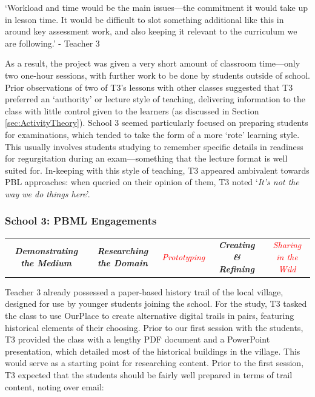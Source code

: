 \begin{displayquote}
`Workload and time would be the main issues---the commitment it would take up in lesson time. It would be difficult to slot something additional like this in around key assessment work, and also keeping it relevant to the curriculum we are following.' - Teacher 3
\end{displayquote}

As a result, the project was given a very short amount of classroom time---only two one-hour sessions, with further work to be done by students outside of school. Prior observations of two of T3's lessons with other classes suggested that T3 preferred an `authority' or lecture style of teaching, delivering information to the class with little control given to the learners (as discussed in Section \ref{sec:ActivityTheory}). School 3 seemed particularly focused on preparing students for examinations, which tended to take the form of a more `rote' learning style. This usually involves students studying to remember specific details in readiness for regurgitation during an exam---something that the lecture format is well suited for. In-keeping with this style of teaching, T3 appeared ambivalent towards PBL approaches: when queried on their opinion of them, T3 noted `\textit{It's not the way we do things here}'.

\subsubsection{School 3: PBML Engagements}

\begin{table}[h]
    \centering
    \begin{tabulary}{\textwidth}{C|C|p{19mm}|C|C}
    \small\textit{\textbf{Demonstrating the Medium}} 
    & \small\textit{\textbf{Researching the Domain}}
    & \small\textit{\textcolor{red}{Prototyping}}
    & \small\textit{\textbf{Creating \& Refining}}
    & \small\textit{\textcolor{red}{Sharing in the Wild}}\\
\end{tabulary}
\end{table}

Teacher 3 already possessed a paper-based history trail of the local village, designed for use by younger students joining the school. For the study, T3 tasked the class to use OurPlace to create alternative digital trails in pairs, featuring historical elements of their choosing. Prior to our first session with the students, T3 provided the class with a lengthy PDF document and a PowerPoint presentation, which detailed most of the historical buildings in the village. This would serve as a starting point for researching content. Prior to the first session, T3 expected that the students should be fairly well prepared in terms of trail content, noting over email: 

